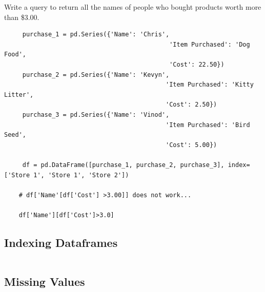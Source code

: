 \documentclass[11pt]{article}
\begin{document}
    Write a query to return all the names of people who bought products worth more than \$3.00.
    \begin{lstlisting}
     purchase_1 = pd.Series({'Name': 'Chris',
                                             'Item Purchased': 'Dog Food',
                                             'Cost': 22.50})
     purchase_2 = pd.Series({'Name': 'Kevyn',
                                            'Item Purchased': 'Kitty Litter',
                                            'Cost': 2.50})
     purchase_3 = pd.Series({'Name': 'Vinod',
                                            'Item Purchased': 'Bird Seed',
                                            'Cost': 5.00})

     df = pd.DataFrame([purchase_1, purchase_2, purchase_3], index=['Store 1', 'Store 1', 'Store 2'])
     
    # df['Name'[df['Cost'] >3.00]] does not work...

    df['Name'][df['Cost']>3.0]
    \end{lstlisting}

     
    \subsection{Indexing Dataframes}
    \begin{lstlisting}
    \end{lstlisting}




























    \subsection{Missing Values}
    \begin{lstlisting}
    \end{lstlisting}
\end{document}
